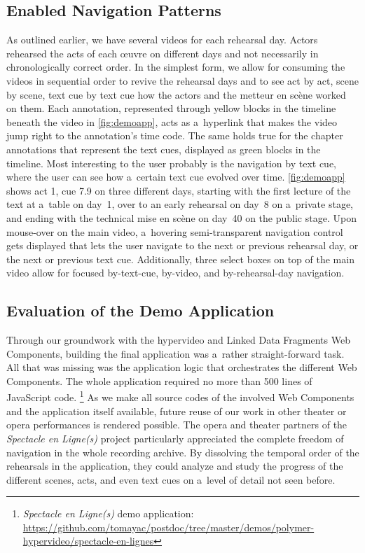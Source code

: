 \documentclass[runningheads,a4paper]{llncs}
\begin{document}
\subsection{Enabled Navigation Patterns}

As outlined earlier, we have several videos for each rehearsal day.
Actors rehearsed the acts of each œuvre on different days
and not necessarily in chronologically correct order.
In the simplest form, we allow for consuming the videos in sequential order
to revive the rehearsal days and to see act by act, scene by scene, text cue by text cue
how the actors and the metteur en scène worked on them.
Each annotation, represented through yellow blocks in the timeline beneath the video
in \autoref{fig:demoapp}, acts as a~hyperlink
that makes the video jump right to the annotation's time code.
The same holds true for the chapter annotations that represent the text cues,
displayed as green blocks in the timeline.
Most interesting to the user probably is the navigation by text cue,
where the user can see how a~certain text cue evolved over time.
\autoref{fig:demoapp} shows act 1, cue 7.9 on three different days,
starting with the first lecture of the text at a~table on day~1,
over to an early rehearsal on day~8 on a~private stage,
and ending with the technical mise en scène on day~40 on the public stage.
Upon mouse-over on the main video, a~hovering semi-transparent navigation control gets displayed
that lets the user navigate to the next or previous rehearsal day,
or the next or previous text cue.
Additionally, three select boxes on top of the main video allow for focused
by-text-cue, by-video, and by-rehearsal-day navigation.

\subsection{Evaluation of the Demo Application}
\label{sec:evaluationo-of-the-demo-application}

Through our groundwork with the hypervideo and Linked Data Fragments Web Components, 
building the final application was a~rather straight-forward task.
All that was missing was the application logic that orchestrates the different Web Components.
The whole application required no more than 500 lines of JavaScript code.%
\footnote{\emph{Spectacle en Ligne(s)} demo application:
\url{https://github.com/tomayac/postdoc/tree/master/demos/polymer-hypervideo/spectacle-en-lignes}}
As we make all source codes of the involved Web Components and the application itself available,
future reuse of our work in other theater or opera performances is rendered possible.
The opera and theater partners of the \emph{Spectacle en Ligne(s)} project
particularly appreciated the complete freedom of navigation in the whole recording archive.
By dissolving the temporal order of the rehearsals in the application,
they could analyze and study the progress of the different scenes, acts,
and even text cues on a~level of detail not seen before. 
\end{document}
